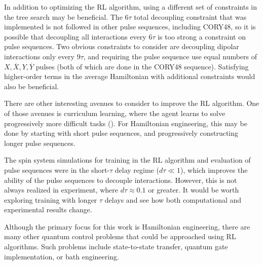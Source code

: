 In addition to optimizing the RL algorithm, using a different set of constraints in the tree search may be beneficial. The $6\tau$ total decoupling constraint that was implemented is not followed in other pulse sequences, including CORY48, so it is possible that decoupling all interactions every $6\tau$ is too strong a constraint on pulse sequences. Two obvious constraints to consider are decoupling dipolar interactions only every $9\tau$, and requiring the pulse sequence use equal numbers of $X, \overline{X}, Y, \overline{Y}$ pulses (both of which are done in the CORY48 sequence). Satisfying higher-order terms in the average Hamiltonian with additional constraints would also be beneficial.

There are other interesting avenues to consider to improve the RL algorithm. One of those avenues is curriculum learning, where the agent learns to solve progressively more difficult tasks (\cite{narvekar2020curriculum}). For Hamiltonian engineering, this may be done by starting with short pulse sequences, and progressively constructing longer pulse sequences.

The spin system simulations for training in the RL algorithm and evaluation of pulse sequences were in the short-$\tau$ delay regime ($d\tau \ll 1$), which improves the ability of the pulse sequences to decouple interactions. However, this is not always realized in experiment, where $d\tau \approx 0.1$ or greater. It would be worth exploring training with longer $\tau$ delays and see how both computational and experimental results change.

Although the primary focus for this work is Hamiltonian engineering, there are many other quantum control problems that could be approached using RL algorithms. Such problems include state-to-state transfer, quantum gate implementation, or bath engineering.
